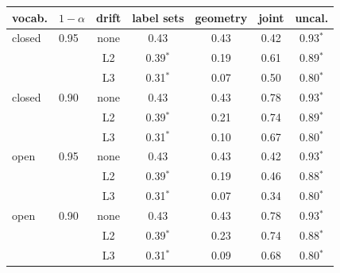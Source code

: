\begin{tabular}{llc|cccc}
\toprule
vocab. & $1-\alpha$ & drift & label sets & geometry & \textbf{joint} & uncal. \\
\midrule
closed & 0.95 & none & 0.43 & 0.43 & 0.42 & 0.93$^\ast$ \\
 &  & L2 & 0.39$^\ast$ & 0.19 & 0.61 & 0.89$^\ast$ \\
 &  & L3 & 0.31$^\ast$ & 0.07 & 0.50 & 0.80$^\ast$ \\
\midrule
closed & 0.90 & none & 0.43 & 0.43 & 0.78 & 0.93$^\ast$ \\
 &  & L2 & 0.39$^\ast$ & 0.21 & 0.74 & 0.89$^\ast$ \\
 &  & L3 & 0.31$^\ast$ & 0.10 & 0.67 & 0.80$^\ast$ \\
\midrule
open & 0.95 & none & 0.43 & 0.43 & 0.42 & 0.93$^\ast$ \\
 &  & L2 & 0.39$^\ast$ & 0.19 & 0.46 & 0.88$^\ast$ \\
 &  & L3 & 0.31$^\ast$ & 0.07 & 0.34 & 0.80$^\ast$ \\
\midrule
open & 0.90 & none & 0.43 & 0.43 & 0.78 & 0.93$^\ast$ \\
 &  & L2 & 0.39$^\ast$ & 0.23 & 0.74 & 0.88$^\ast$ \\
 &  & L3 & 0.31$^\ast$ & 0.09 & 0.68 & 0.80$^\ast$ \\
\bottomrule
\end{tabular}
